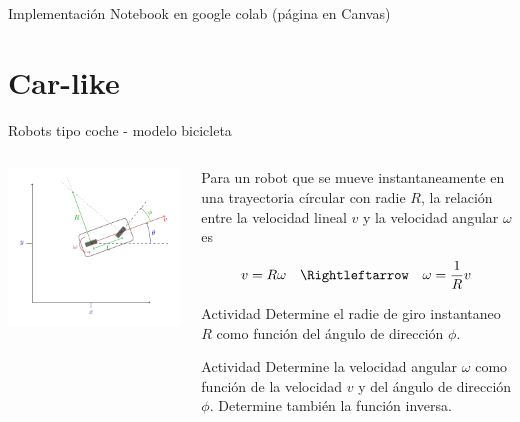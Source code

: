 \documentclass[presentation,aspectratio=169]{beamer}
\begin{document}
\begin{frame}[label={sec:org4f686c1}]{Implementación}
Notebook en google colab (página en Canvas)
\end{frame}


\section{Car-like}
\label{sec:org2cd4728}

\begin{frame}[label={sec:org1421399}]{Robots tipo coche - modelo bicicleta}
\begin{columns}
\begin{column}{0.4\columnwidth}
\begin{center}
 \includegraphics[width=1.05\linewidth]{../figures/bicycle-model}
\end{center}
\end{column}

\begin{column}{0.6\columnwidth}
\pause

Para un robot que se mueve instantaneamente en una trayectoria círcular con radie \(R\), la relación entre la velocidad lineal \(v\) y la velocidad angular \(\omega\) es

\pause

\[ v = R\omega \quad \Rightleftarrow \quad \omega = \frac{1}{R} v \]

\pause
\alert{Actividad} Determine el radie de giro instantaneo \(R\) como función del ángulo de dirección \(\phi\).

\pause
\alert{Actividad} Determine la velocidad angular \(\omega\) como función de la velocidad \(v\) y del ángulo de dirección \(\phi\). Determine también la función inversa.
\end{column}
\end{columns}
\end{frame}
\end{document}
